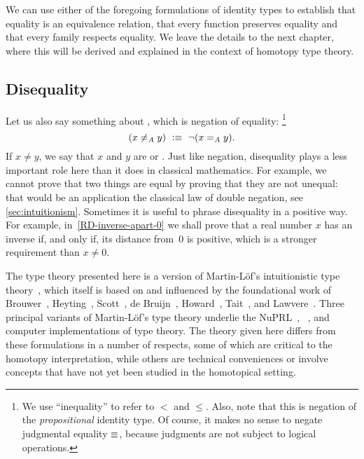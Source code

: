 We can use either of the foregoing formulations of identity types
to establish that equality is an equivalence relation, that every function preserves equality and that every family respects equality. We leave the details to the next chapter, where this will be derived  and explained in the context of homotopy type theory.

\subsection{Disequality}
\label{sec:disequality}

Let us also say something about ,
%
which is negation of equality:%
\footnote{We use ``inequality''
  to refer to $<$ and $\leq$. Also, note that this is negation of the \emph{propositional} identity type.
Of course, it makes no sense to negate judgmental equality $\jdeq$, because judgments are not subject to logical operations.}
%
\begin{equation*}
  (x \neq_A y) \ \defeq\ \lnot (\id[A]{x}{y}).
\end{equation*}
If $x\neq y$, we say that $x$ and $y$ are 
%
or .
%
Just like negation, disequality plays a less important role here than it does in classical
mathematics. For example, we cannot prove that two things are equal by proving that they
are not unequal: that would be an application the classical law of double negation, see \autoref{sec:intuitionism}.
Sometimes it is useful to phrase disequality in a positive way. For example,
in~\autoref{RD-inverse-apart-0} we shall prove that a real number $x$ has an inverse if,
and only if, its distance from~$0$ is positive, which is a stronger requirement than $x
\neq 0$.

%

\sectionNotes

The type theory presented here is a version of Martin-L\"{o}f's intuitionistic type 
theory~\cite{martinlof71itt,Martin-Lof-1972,Martin-Lof-1973,Martin-Lof-1979,martin-lof:bibliopolis}, which itself is based on and influenced 
by the foundational work of Brouwer~\cite{beeson}, Heyting~\cite{heyting1966intuitionism}, Scott~\cite{scott70}, de 
Bruijn~\cite{deBruijn-1973}, Howard~\cite{howard:pat}, Tait~\cite{Tait-1966,Tait-1968}, and Lawvere~\cite{lawvere:adjinfound}.
%
Three principal variants of Martin-L\"{o}f's type theory underlie the NuPRL~\cite{constable+86nuprl-book}, \Coq~\cite{Coq}, and 
\Agda \cite{norell2007towards} computer implementations of type theory.  The theory given here differs from these formulations in a number 
of respects, some of which are critical to the homotopy interpretation, while others are technical conveniences or involve concepts that 
have not yet been studied in the homotopical setting.

